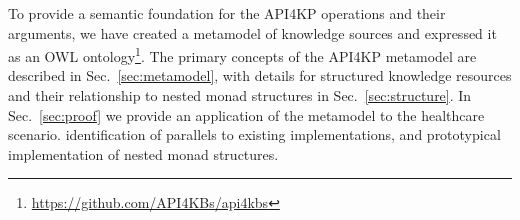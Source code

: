 \documentclass[runningheads]{llncs}
\begin{document}
To provide a semantic foundation for the API4KP operations and their arguments, we have created a metamodel of knowledge sources and expressed it as an OWL ontology\footnote{\url{https://github.com/API4KBs/api4kbs}}.
The primary concepts  of the API4KP metamodel are described in Sec.~\ref{sec:metamodel}, with details for structured knowledge resources 
and their relationship to nested monad structures in Sec.~\ref{sec:structure}.
In Sec.~\ref{sec:proof} we provide an application of the metamodel to the healthcare scenario.
% 
identification of parallels to existing implementations, and prototypical implementation of nested monad structures.


\end{document}
